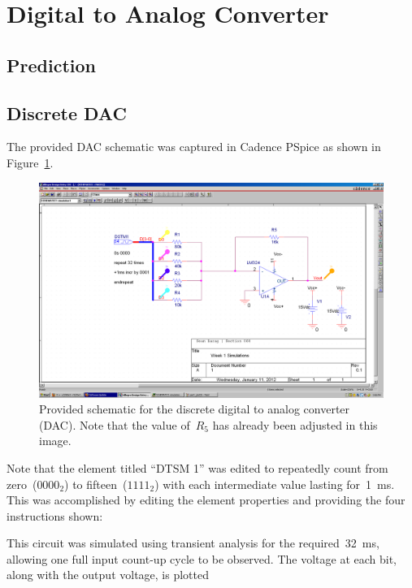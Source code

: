 \section{Digital to Analog Converter}
\subsection{Prediction}

\subsection{Discrete DAC}
The provided DAC schematic was captured in Cadence PSpice as shown in
Figure~\ref{f:dac_schem}.
%
\begin{figure}[H]
\centering
	\includegraphics[width=.8\textwidth]{img/shot/part1_schem.PNG}
	\parbox{.8\textwidth}{
	\caption[Discrete DAC --- Schematic]{Provided schematic for the discrete digital to analog converter (DAC).  Note that the value of~$R_5$ has already been adjusted in this image.}
	\label{f:dac_schem}}
\end{figure}
%
Note that the element titled ``DTSM 1'' was edited to repeatedly count from
zero~($0000_2$) to fifteen~($1111_2$) with each intermediate value
lasting for~\SI{1}{\milli\second}.  This was accomplished by editing the element properties and providing the four instructions shown:
%
\begin{itemize*}
	\item {}
	\item {}
	\item {}
	\item {}
\end{itemize*}
%
This circuit was simulated using transient analysis for the
required~\SI{32}{\milli\second}, allowing one full input count-up cycle to be
observed.  The voltage at each bit, along with the output voltage, is plotted
